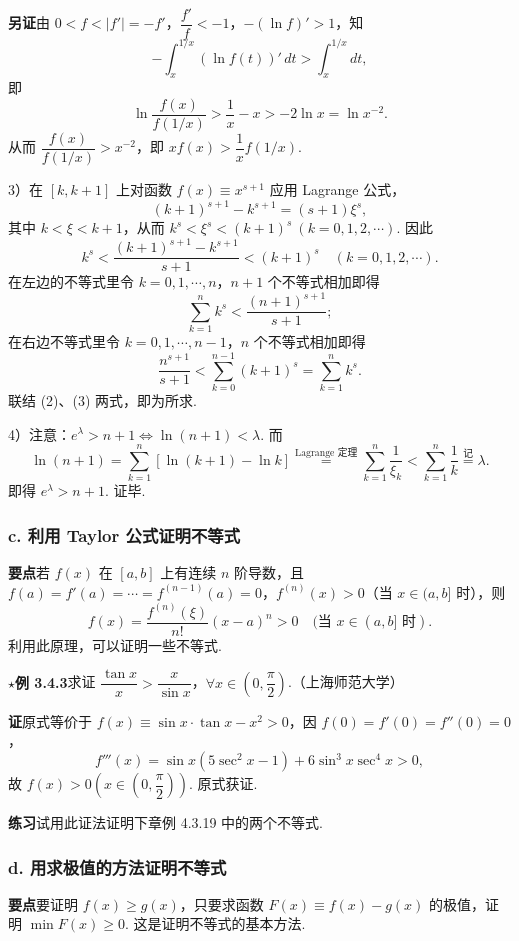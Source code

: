 \documentclass[UTF8,12pt,a4paper,fontset=fandol]{ctexart}
\begin{document}
\noindent\textbf{另证}\quad 由 $0<f<|f'|=-f'$，$\dfrac{f'}f<-1$，$-(\ln f)'>1$，知
\[
  -\int_x^{1/x}(\ln f(t))'\,dt>\int_x^{1/x}dt,
\]
即
\[
  \ln\frac{f(x)}{f(1/x)}>\frac1x-x>-2\ln x=\ln x^{-2}.
\]
从而 $\dfrac{f(x)}{f(1/x)}>x^{-2}$，即 $xf(x)>\dfrac1x f(1/x)$.

3）在 $[k,k+1]$ 上对函数 $f(x)\equiv x^{s+1}$ 应用 Lagrange 公式，
\[
  (k+1)^{s+1}-k^{s+1}=(s+1)\xi^s,
\]
其中 $k<\xi<k+1$，从而 $k^s<\xi^s<(k+1)^s\ (k=0,1,2,\cdots)$. 因此
\[
  k^s<\frac{(k+1)^{s+1}-k^{s+1}}{s+1}<(k+1)^s\quad(k=0,1,2,\cdots). \tag{1}
\]
在左边的不等式里令 $k=0,1,\cdots,n$，$n+1$ 个不等式相加即得
\[
  \sum_{k=1}^n k^s<\frac{(n+1)^{s+1}}{s+1}; \tag{2}
\]
在右边不等式里令 $k=0,1,\cdots,n-1$，$n$ 个不等式相加即得
\[
  \frac{n^{s+1}}{s+1}<\sum_{k=0}^{n-1}(k+1)^s=\sum_{k=1}^n k^s. \tag{3}
\]
联结 (2)、(3) 两式，即为所求.

4）注意：$e^\lambda>n+1\Leftrightarrow \ln(n+1)<\lambda$. 而
\[
  \ln(n+1)=\sum_{k=1}^n[\ln(k+1)-\ln k]
  \overset{\text{Lagrange 定理}}{=}\sum_{k=1}^n\frac1{\xi_k}
  <\sum_{k=1}^n\frac1k\overset{\text{记}}{=}\lambda.
\]
即得 $e^\lambda>n+1$. 证毕.

\subsubsection*{c. 利用 Taylor 公式证明不等式}

\noindent\textbf{要点}\quad 若 $f(x)$ 在 $[a,b]$ 上有连续 $n$ 阶导数，且 $f(a)=f'(a)=\cdots=f^{(n-1)}(a)=0$，$f^{(n)}(x)>0$（当 $x\in(a,b]$ 时），则
\[
  f(x)=\frac{f^{(n)}(\xi)}{n!}(x-a)^n>0\quad(\text{当 }x\in(a,b]\text{ 时}).
\]
利用此原理，可以证明一些不等式.

\noindent\textbf{$\star$例 3.4.3}\quad 求证 $\dfrac{\tan x}{x}>\dfrac{x}{\sin x}$，$\forall x\in\left(0,\dfrac\pi2\right)$.（上海师范大学）

\noindent\textbf{证}\quad 原式等价于 $f(x)\equiv \sin x\cdot\tan x-x^2>0$，因 $f(0)=f'(0)=f''(0)=0$，
\[
  f'''(x)=\sin x(5\sec^2x-1)+6\sin^3x\sec^4x>0,
\]
故 $f(x)>0\left(x\in\left(0,\dfrac\pi2\right)\right)$. 原式获证.

\noindent\textbf{练习}\quad 试用此证法证明下章例 4.3.19 中的两个不等式.

\subsubsection*{d. 用求极值的方法证明不等式}

\noindent\textbf{要点}\quad 要证明 $f(x)\ge g(x)$，只要求函数 $F(x)\equiv f(x)-g(x)$ 的极值，证明 $\min F(x)\ge0$. 这是证明不等式的基本方法.
\end{document}
